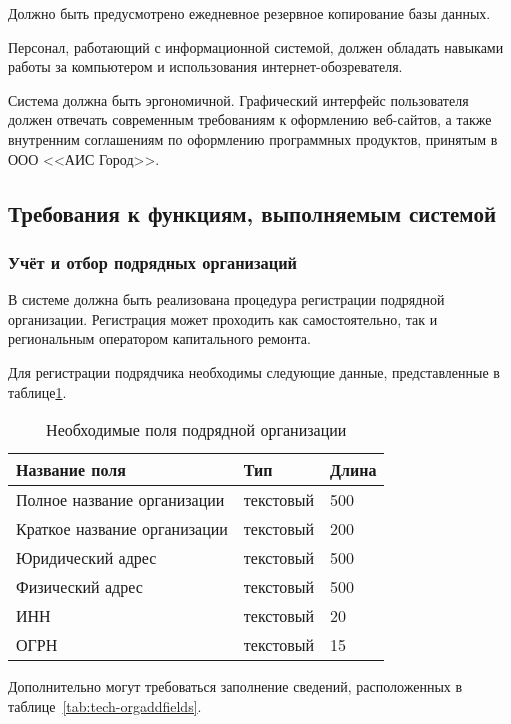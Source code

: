 Должно быть предусмотрено ежедневное резервное копирование базы данных.

Персонал, работающий с информационной системой, должен обладать навыками работы за компьютером и использования интернет-обозревателя.

Система должна быть эргономичной.
Графический интерфейс пользователя должен отвечать современным требованиям к оформлению веб-сайтов, а также внутренним соглашениям по оформлению программных продуктов, принятым в ООО <<АИС Город>>.

\subsection{Требования к функциям, выполняемым системой}

\subsubsection{Учёт и отбор подрядных организаций}

В системе должна быть реализована процедура регистрации подрядной организации.
Регистрация может проходить как самостоятельно, так и региональным оператором капитального ремонта.

Для регистрации подрядчика необходимы следующие данные, представленные в таблице\ref{tab:tech-orgfields}.

\begin{footnotesize}
\begin{longtable}[h]{|p{}|p{}|p{}|}
	\caption{\label{tab:tech-orgfields}Необходимые поля подрядной организации} \\
	\hline
		\textbf{Название поля} & \textbf{Тип} & \textbf{Длина} \\
	\hline \endhead
		Полное название организации & текстовый & 500 \\
	\hline
		Краткое название организации & текстовый & 200 \\
	\hline
		Юридический адрес & текстовый & 500 \\
	\hline
		Физический адрес & текстовый & 500 \\
	\hline
		ИНН & текстовый & 20 \\
	\hline
		ОГРН & текстовый & 15 \\
	\hline
\end{longtable}
\end{footnotesize}

Дополнительно могут требоваться заполнение сведений, расположенных в таблице~\ref{tab:tech-orgaddfields}.

